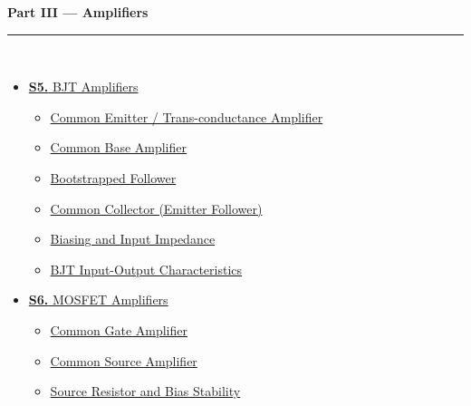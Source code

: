 \documentclass[12pt,a4paper]{article}
\begin{document}
\begin{tcolorbox}[breakable,colback=cC!5,colframe=cC,boxrule=1pt,arc=5pt,
  left=8pt,right=8pt,top=8pt,bottom=8pt,before skip=4pt]
  {\large\bfseries\textcolor{cC}{Part III --- Amplifiers}}\\[5pt]
  \textcolor{cC!40}{\rule{\textwidth}{0.4pt}}\\[3pt]
  \small\begin{itemize}[leftmargin=1.2em,itemsep=1pt,label={\textcolor{cC}{$\triangleright$}}]
    \item \hyperref[sec:S5]{\textbf{S5.} BJT Amplifiers}
      \begin{itemize}[leftmargin=1.5em,itemsep=0pt,label={\textcolor{cC}{$\cdot$}}]
        \item \hyperref[sub:s5-ce]{Common Emitter / Trans-conductance Amplifier}
        \item \hyperref[sub:s5-cb]{Common Base Amplifier}
        \item \hyperref[sub:s5-bootstrap]{Bootstrapped Follower}
        \item \hyperref[sub:s5-cc]{Common Collector (Emitter Follower)}
        \item \hyperref[sub:s5-biasimpedance]{Biasing and Input Impedance}
        \item \hyperref[sub:s5-io]{BJT Input-Output Characteristics}
      \end{itemize}
    \item \hyperref[sec:S6]{\textbf{S6.} MOSFET Amplifiers}
      \begin{itemize}[leftmargin=1.5em,itemsep=0pt,label={\textcolor{cC}{$\cdot$}}]
        \item \hyperref[sub:s6-cg]{Common Gate Amplifier}
        \item \hyperref[sub:s6-cs]{Common Source Amplifier}
        \item \hyperref[sub:s6-rs-bias]{Source Resistor and Bias Stability}
      \end{itemize}
  \end{itemize}
\end{tcolorbox}

\vspace{6pt}
\end{document}
